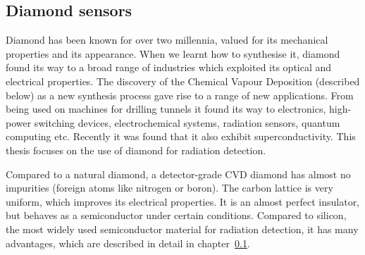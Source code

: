 \documentclass[twoside,12pt]{packages/mytustyle}  %
\begin{document}
\subsection{Diamond sensors}
Diamond has been known for over two millennia, valued for its mechanical properties and its appearance. When we learnt how to synthesise it, diamond found its way to a broad range of industries which exploited its optical and electrical properties. The discovery of the Chemical Vapour Deposition (described below) as a new synthesis process gave rise to a range of new applications. From being used on machines for drilling tunnels it found its way to electronics, high-power switching devices, electrochemical systems, radiation sensors, quantum computing etc. Recently it was found that it also exhibit superconductivity. This thesis focuses on the use of diamond for radiation detection.

Compared to a natural diamond, a detector-grade CVD diamond has almost no impurities (foreign atoms like nitrogen or boron). The carbon lattice is very uniform, which improves its electrical properties. It is an almost perfect insulator, but behaves as a semiconductor under certain conditions. Compared to silicon, the most widely used semiconductor material for radiation detection, it has many advantages, which are described in detail in chapter~\ref{}.


\end{document}
